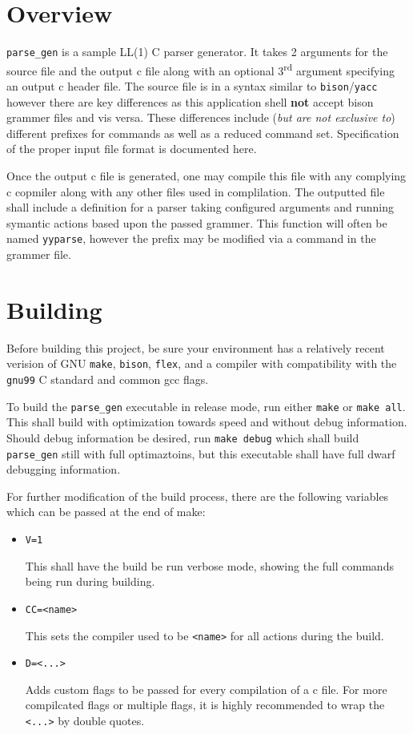 \documentclass[12pt,a4paper]{article}
\begin{document}
\section*{Overview}

\texttt{parse\_gen} is a sample LL(1) C parser generator.
It takes 2 arguments for the source file and the output c file along with an optional 3\textsuperscript{rd} argument specifying an output c header file.
The source file is in a syntax similar to \texttt{bison}/\texttt{yacc} however there are key differences as this application shell \textbf{not} accept bison grammer files and vis versa.
These differences include (\textit{but are not exclusive to}) different prefixes for commands as well as a reduced command set.
Specification of the proper input file format is documented here.

Once the output c file is generated, one may compile this file with any complying c copmiler along with any other files used in complilation.
The outputted file shall include a definition for a parser taking configured arguments and running symantic actions based upon the passed grammer.
This function will often be named \texttt{yyparse}, however the prefix may be modified via a command in the grammer file.

\section*{Building}

Before building this project, be sure your environment has a relatively recent verision of GNU \texttt{make}, \texttt{bison}, \texttt{flex}, and a compiler with compatibility with the \texttt{gnu99} C standard and common gcc flags.

To build the \texttt{parse\_gen} executable in release mode, run either \texttt{make} or \texttt{make all}.
This shall build with optimization towards speed and without debug information.
Should debug information be desired, run \texttt{make debug} which shall build \texttt{parse\_gen} still with full optimaztoins, but this executable shall have full dwarf debugging information.

For further modification of the build process, there are the following variables which can be passed at the end of make:
\begin{itemize}
	\item \texttt{V=1}

	This shall have the build be run verbose mode, showing the full commands being run during building.

	\item \texttt{CC=<name>}

	This sets the compiler used to be \texttt{<name>} for all actions during the build.

	\item \texttt{D=<...>}

	Adds custom flags to be passed for every compilation of a c file.
	For more compilcated flags or multiple flags, it is highly recommended to wrap the \texttt{<...>} by double quotes.
\end{itemize}
\end{document}
